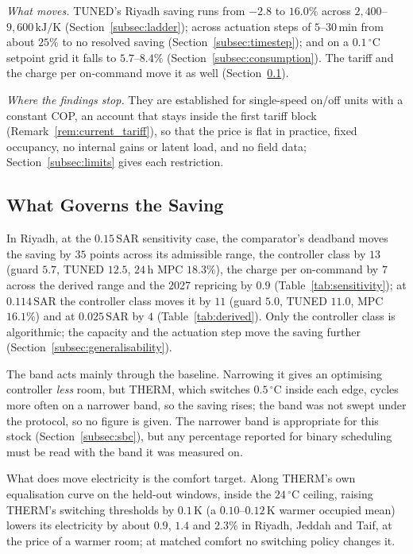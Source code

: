 \documentclass[pdflatex,sn-mathphys-num,iicol]{sn-jnl}
\theoremstyle{thmstyleone}\newtheorem{proposition}{Proposition}\newtheorem{corollary}{Corollary}
\theoremstyle{thmstyletwo}\newtheorem{remark}{Remark}\newtheorem{observation}{Observation}
\theoremstyle{thmstylethree}\newtheorem{definition}{Definition}
\newcommand{\SAR}{\text{SAR}}
\begin{document}
\emph{What moves.} TUNED's Riyadh saving runs from $-2.8$ to $16.0\%$ across $2{,}400$--$9{,}600\,\text{kJ/K}$ (Section~\ref{subsec:ladder}); across actuation steps of $5$--$30\,$min from about $25\%$ to no resolved saving (Section~\ref{subsec:timestep}); and on a $0.1\,^\circ$C setpoint grid it falls to $5.7$--$8.4\%$ (Section~\ref{subsec:consumption}). The tariff and the charge per on-command move it as well (Section~\ref{subsec:disc_band}).

\emph{Where the findings stop.} They are established for single-speed on/off units with a constant COP, an account that stays inside the first tariff block (Remark~\ref{rem:current_tariff}), so that the price is flat in practice, fixed occupancy, no internal gains or latent load, and no field data; Section~\ref{subsec:limits} gives each restriction.

\subsection{What Governs the Saving}
\label{subsec:disc_band}
\label{subsec:disc_tariff}
\label{subsec:disc_modele}

In Riyadh, at the $0.15\,\SAR$ sensitivity case, the comparator's deadband moves the saving by $35$ points across its admissible range, the controller class by $13$ (guard $5.7$, TUNED $12.5$, $24\,$h MPC $18.3\%$), the charge per on-command by $7$ across the derived range and the 2027 repricing by $0.9$ (Table~\ref{tab:sensitivity}); at $0.114\,\SAR$ the controller class moves it by $11$ (guard $5.0$, TUNED $11.0$, MPC $16.1\%$) and at $0.025\,\SAR$ by $4$ (Table~\ref{tab:derived}). Only the controller class is algorithmic; the capacity and the actuation step move the saving further (Section~\ref{subsec:generalisability}).

The band acts mainly through the baseline. Narrowing it gives an optimising controller \emph{less} room, but THERM, which switches $0.5\,^\circ$C inside each edge, cycles more often on a narrower band, so the saving rises; the band was not swept under the protocol, so no figure is given. The narrower band is appropriate for this stock (Section~\ref{subsec:sbc}), but any percentage reported for binary scheduling must be read with the band it was measured on.

What does move electricity is the comfort target. Along THERM's own equalisation curve on the held-out windows, inside the $24\,^\circ$C ceiling, raising THERM's switching thresholds by $0.1\,$K (a $0.10$--$0.12\,$K warmer occupied mean) lowers its electricity by about $0.9$, $1.4$ and $2.3\%$ in Riyadh, Jeddah and Taif, at the price of a warmer room; at matched comfort no switching policy changes it.
\end{document}
